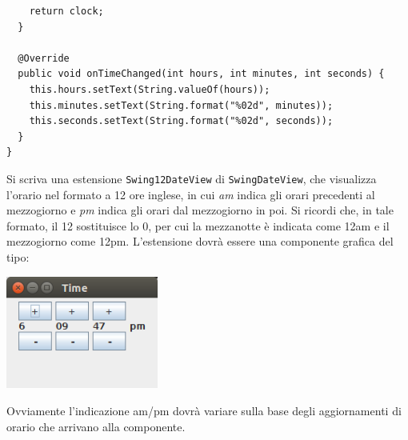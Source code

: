 \documentclass{article}[10pt]
\newcounter{esnu}
\newenvironment{esercizio}{\medskip \noindent {\bf Esercizio\addtocounter{esnu}{1} \arabic{esnu}}}{}
\begin{document}
\begin{esercizio}
{\begin{verbatim}
    return clock;
  }

  @Override
  public void onTimeChanged(int hours, int minutes, int seconds) {
    this.hours.setText(String.valueOf(hours));
    this.minutes.setText(String.format("%02d", minutes));
    this.seconds.setText(String.format("%02d", seconds));
  }
}
\end{verbatim}}

\noindent
Si scriva una estensione \texttt{Swing12DateView} di \texttt{SwingDateView}, che visualizza l'orario
nel formato a 12 ore inglese, in cui \emph{am} indica gli orari precedenti al mezzogiorno
e \emph{pm} indica gli orari dal mezzogiorno in poi.
Si ricordi che, in tale formato, il 12 sostituisce lo 0, per cui la mezzanotte \`e indicata
come 12am e il mezzogiorno come 12pm. L'estensione dovr\`a essere una componente grafica del tipo:

\begin{center}
\includegraphics[width=5cm]{Swing12DateView}
\end{center}

\noindent
Ovviamente l'indicazione am/pm dovr\`a variare sulla base degli aggiornamenti di orario che
arrivano alla componente.
\end{esercizio}
\end{document}
